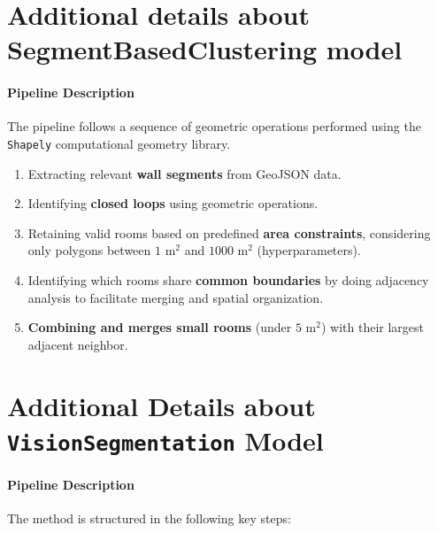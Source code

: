 \documentclass[11pt]{article}
\begin{document}
\section{Additional details about SegmentBasedClustering model}
\label{app:sec:SBCdetails}
\paragraph{Pipeline Description} The pipeline follows a sequence of geometric operations performed using the 
\texttt{Shapely} computational geometry library.

\begin{enumerate}
    \item  Extracting relevant \textbf{wall segments} from GeoJSON data.
    \item Identifying \textbf{closed loops} using geometric operations.
    \item Retaining valid rooms based on predefined \textbf{area constraints}, 
    considering only polygons between $1 \text{ m}^2$ and $1000 \text{ m}^2$ (hyperparameters).
    \item Identifying which rooms share \textbf{common boundaries} by doing adjacency 
    analysis to facilitate merging and spatial organization.
    \item \textbf{Combining and merges small rooms} (under $5 \text{ m}^2$) with their 
    largest adjacent neighbor.
\end{enumerate}

\section{Additional Details about \texttt{VisionSegmentation} Model}
\label{app:sec:CVdetails}
\paragraph{Pipeline Description}
The method is structured in the following key steps:
\end{document}
